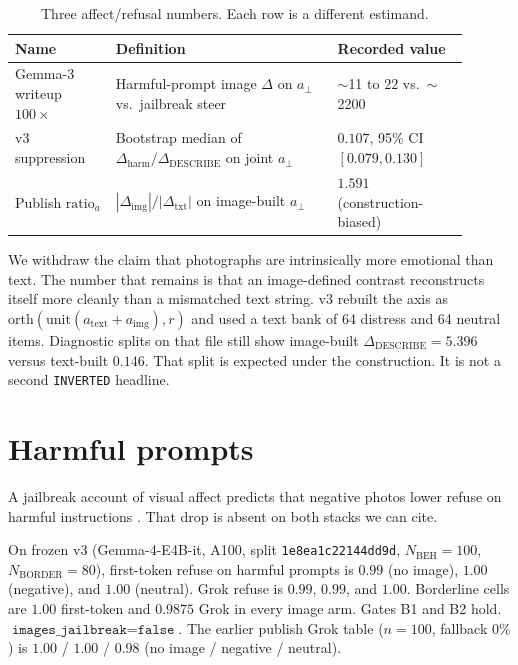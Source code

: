 \documentclass{article}
\begin{document}
\begin{table}[t]
\caption{Three affect/refusal numbers. Each row is a different estimand.}
\label{tab:three}
\centering
\footnotesize
\begin{tabular}{@{}p{0.20\linewidth}p{0.44\linewidth}p{0.26\linewidth}@{}}
\toprule
Name & Definition & Recorded value \\
\midrule
Gemma-3 writeup $100\times$ & Harmful-prompt image $\Delta$ on $a_\perp$ vs.\ jailbreak steer & $\sim$11 to $22$ vs.\ $\sim$2200 \\
v3 suppression & Bootstrap median of $\Delta_{\mathrm{harm}}/\Delta_{\mathrm{DESCRIBE}}$ on joint $a_\perp$ & $0.107$, 95\% CI $[0.079,0.130]$ \\
Publish $\mathrm{ratio}_a$ & $|\Delta_{\mathrm{img}}|/|\Delta_{\mathrm{txt}}|$ on image-built $a_\perp$ & $1.591$ (construction-biased) \\
\bottomrule
\end{tabular}
\end{table}

We withdraw the claim that photographs are intrinsically more emotional than text. The number that remains is that an image-defined contrast reconstructs itself more cleanly than a mismatched text string. v3 rebuilt the axis as $\mathrm{orth}(\mathrm{unit}(a_{\mathrm{text}}+a_{\mathrm{img}}),r)$ and used a text bank of 64 distress and 64 neutral items. Diagnostic splits on that file still show image-built $\Delta_{\mathrm{DESCRIBE}}=5.396$ versus text-built $0.146$. That split is expected under the construction. It is not a second \texttt{INVERTED} headline.

\section{Harmful prompts}
\label{sec:null}

A jailbreak account of visual affect predicts that negative photos lower refuse on harmful instructions \citep{zou2023universal}. That drop is absent on both stacks we can cite.

On frozen v3 (Gemma-4-E4B-it, A100, split \texttt{1e8ea1c22144dd9d}, $N_{\mathrm{BEH}}=100$, $N_{\mathrm{BORDER}}=80$), first-token refuse on harmful prompts is $0.99$ (no image), $1.00$ (negative), and $1.00$ (neutral). Grok refuse is $0.99$, $0.99$, and $1.00$. Borderline cells are $1.00$ first-token and $0.9875$ Grok in every image arm. Gates B1 and B2 hold. $\texttt{images\_jailbreak}=\texttt{false}$. The earlier publish Grok table ($n=100$, fallback $0\%$) is $1.00$ / $1.00$ / $0.98$ (no image / negative / neutral).
\end{document}
